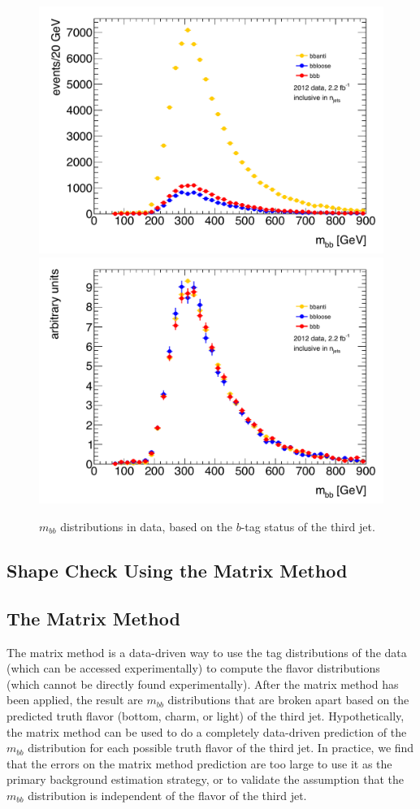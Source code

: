 \begin{figure}[hbt]
  \includegraphics[width=0.5\linewidth]{BackgroundEstimation/images/mbb_bbb_bbloose_bbanti_r200-215.pdf}
  \includegraphics[width=0.5\linewidth]{BackgroundEstimation/images/mbb_bbb_bbloose_bbanti_r200-215_normalized.pdf}
  \caption{$m_{bb}$ distributions in data, based on the $b$-tag status of the third jet. 
    \label{fig:mbb_data} }
\end{figure}


\subsection{Shape Check Using the Matrix Method}








\subsection{The Matrix Method}
The matrix method is a data-driven way to use the tag distributions of the data (which can be accessed experimentally) to compute the flavor distributions (which cannot be directly found experimentally).  After the matrix method has been applied, the result are $m_{bb}$ distributions that are broken apart based on the predicted truth flavor (bottom, charm, or light) of the third jet.  Hypothetically,
the matrix method can be used to do a completely data-driven prediction of the $m_{bb}$ distribution
for each possible truth flavor of the third jet.  In practice, we find that the errors on the matrix
method prediction are too large to use it as the primary background estimation strategy, or to validate
the assumption that the $m_{bb}$ distribution is independent of the flavor of the third jet.  

